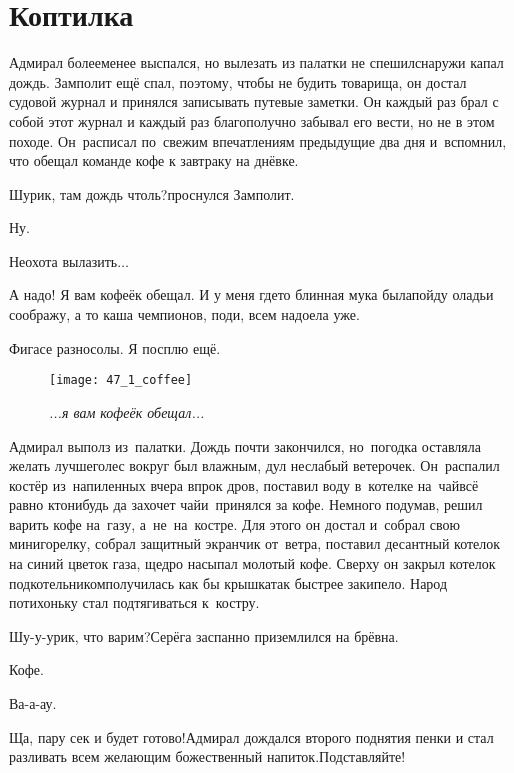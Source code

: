 \chapter{Коптилка}
\vepsianrose

Адмирал более\sdash менее выспался, но вылезать из палатки не спешил\mdash снаружи капал дождь. Замполит ещё спал, поэтому, чтобы не будить товарища, он достал судовой журнал и принялся записывать путевые заметки. Он каждый раз брал с собой этот журнал и каждый раз благополучно забывал его вести, но не в этом походе. Он~расписал по~свежим впечатлениям предыдущие два дня и~вспомнил, что обещал команде кофе к завтраку на днёвке.

\diagdash Шурик, там дождь чтоль?\mdash проснулся Замполит.

\diagdash Ну.

\diagdash Неохота вылазить$\ldots$

\diagdash А надо! Я вам кофеёк обещал. И у меня где\sdash то блинная мука была\mdash пойду оладьи соображу, а то каша чемпионов, поди, всем надоела уже.

\diagdash Фигасе разносолы. Я посплю ещё.

\newpage
\begin{wrapfigure}[13]{l}{0.5\textwidth}
	\centering
	\texttt{[image: 47\_1\_coffee]}
	\caption{\small\textit{...я вам кофеёк обещал...}}
\end{wrapfigure}
Адмирал выполз из~палатки. Дождь почти закончился, но~погодка оставляла желать лучшего\mdash лес вокруг был влажным, дул неслабый ветерочек. Он~распалил костёр из~напиленных вчера впрок дров, поставил воду в~котелке на~чай\mdash всё равно кто\sdash нибудь да захочет чай\mdash и~принялся за кофе. Немного подумав, решил варить кофе на~газу, а~не~на~костре. Для этого он достал и~собрал свою мини\sdash горелку, собрал защитный экранчик от~ветра, поставил десантный котелок на синий цветок газа, щедро насыпал молотый кофе. Сверху он закрыл котелок подкотельником\mdash получилась как бы крышка\mdash так быстрее закипело. Народ потихоньку стал подтягиваться к~костру.

\diagdash Шу-у-урик, что варим?\mdash Серёга заспанно приземлился на брёвна.

\diagdash Кофе.

\diagdash Ва-а-ау.

\diagdash Ща, пару сек и будет готово!\mdash Адмирал дождался второго поднятия пенки и стал разливать всем желающим божественный напиток.\mdash Подставляйте!

